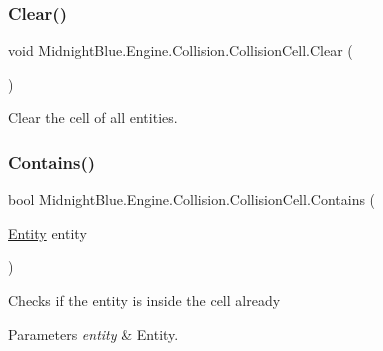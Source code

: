 \subsubsection{\texorpdfstring{Clear()}{Clear()}}
{\footnotesize\ttfamily void Midnight\+Blue.\+Engine.\+Collision.\+Collision\+Cell.\+Clear (\begin{DoxyParamCaption}{ }\end{DoxyParamCaption})\hspace{0.3cm}{\ttfamily [inline]}}



Clear the cell of all entities. 

\hypertarget{class_midnight_blue_1_1_engine_1_1_collision_1_1_collision_cell_aafba8ca6c6fd79c297abb3e7590c269f}{}\label{class_midnight_blue_1_1_engine_1_1_collision_1_1_collision_cell_aafba8ca6c6fd79c297abb3e7590c269f} 
\subsubsection{\texorpdfstring{Contains()}{Contains()}}
{\footnotesize\ttfamily bool Midnight\+Blue.\+Engine.\+Collision.\+Collision\+Cell.\+Contains (\begin{DoxyParamCaption}\item[{\hyperlink{class_midnight_blue_1_1_engine_1_1_entity_component_1_1_entity}{Entity}}]{entity }\end{DoxyParamCaption})\hspace{0.3cm}{\ttfamily [inline]}}



Checks if the entity is inside the cell already 


\begin{DoxyParams}{Parameters}
{\em entity} & Entity.\\
\hline
\end{DoxyParams}
\hypertarget{class_midnight_blue_1_1_engine_1_1_collision_1_1_collision_cell_acaf2c0f24b2854d5f02ea2a3c20d0d04}{}\label{class_midnight_blue_1_1_engine_1_1_collision_1_1_collision_cell_acaf2c0f24b2854d5f02ea2a3c20d0d04} 
